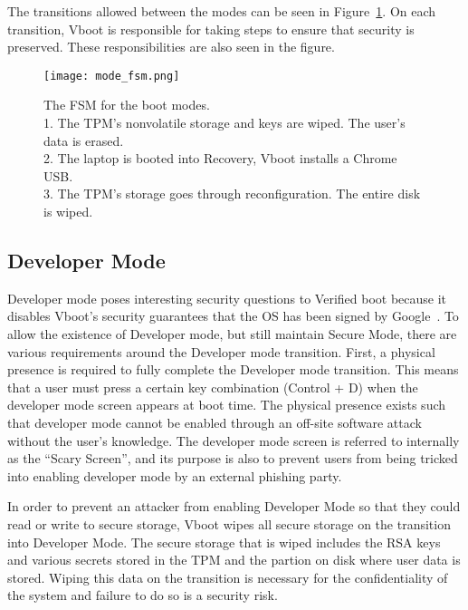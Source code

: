 The transitions allowed between the modes can be seen in
Figure~\ref{fig:mode_fsm}.
On each transition, Vboot is responsible for taking steps to ensure that
security is preserved. 
These responsibilities are also seen in the figure.

\begin{figure}
  \centering
  \texttt{[image: mode\_fsm.png]}
  \caption[Vboot Boot Mode FSM]{The FSM for the boot modes. \\
  1. The TPM's nonvolatile storage and keys are wiped. The user's data
  is erased. \\
  2. The laptop is booted into Recovery, Vboot installs a Chrome USB.
  \\
  3. The TPM's storage goes through reconfiguration. The entire disk is wiped.
  \\}\label{fig:mode_fsm}
\end{figure}

\subsection{Developer Mode}

Developer mode poses interesting security questions to Verified boot because it
disables Vboot's security guarantees that the OS has been signed by Google~\cite{developer-mode}. 
To allow the existence of Developer mode, but still maintain 
Secure Mode, there are various requirements around the Developer mode transition.
First, a physical presence is required to fully complete the Developer mode transition. 
This means that a user must press a certain key combination (Control + D) when
the developer mode screen appears at boot time.
The physical presence exists such that developer mode cannot be enabled through an off-site software attack without the user's knowledge.
The developer mode screen is referred to internally as the ``Scary Screen'', and its purpose is also to prevent users from being tricked into enabling developer mode by an external phishing party.

In order to prevent an attacker from enabling Developer Mode so that they could
read or write to secure storage, Vboot wipes all secure storage on the transition into Developer Mode.
The secure storage that is wiped includes the RSA keys and various secrets stored in the TPM and the partion on disk where user data is stored.
Wiping this data on the transition is necessary for the confidentiality of the system and failure to do so is a security risk.

